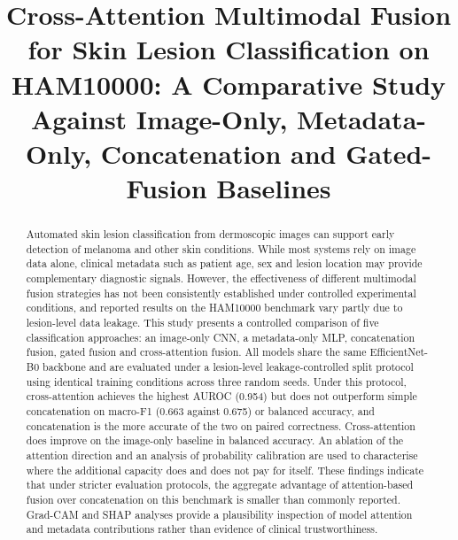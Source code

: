 \documentclass[conference]{IEEEtran}
\begin{document}
\title{Cross-Attention Multimodal Fusion for Skin Lesion Classification on HAM10000: A Comparative Study Against Image-Only, Metadata-Only, Concatenation and Gated-Fusion Baselines}

\author{
}

\maketitle

\begin{abstract}
Automated skin lesion classification from dermoscopic images can support early detection of melanoma and other skin conditions. While most systems rely on image data alone, clinical metadata such as patient age, sex and lesion location may provide complementary diagnostic signals. However, the effectiveness of different multimodal fusion strategies has not been consistently established under controlled experimental conditions, and reported results on the HAM10000 benchmark vary partly due to lesion-level data leakage. This study presents a controlled comparison of five classification approaches: an image-only CNN, a metadata-only MLP, concatenation fusion, gated fusion and cross-attention fusion. All models share the same EfficientNet-B0 backbone and are evaluated under a lesion-level leakage-controlled split protocol using identical training conditions across three random seeds. Under this protocol, cross-attention achieves the highest AUROC (0.954) but does not outperform simple concatenation on macro-F1 (0.663 against 0.675) or balanced accuracy, and concatenation is the more accurate of the two on paired correctness. Cross-attention does improve on the image-only baseline in balanced accuracy. An ablation of the attention direction and an analysis of probability calibration are used to characterise where the additional capacity does and does not pay for itself. These findings indicate that under stricter evaluation protocols, the aggregate advantage of attention-based fusion over concatenation on this benchmark is smaller than commonly reported. Grad-CAM and SHAP analyses provide a plausibility inspection of model attention and metadata contributions rather than evidence of clinical trustworthiness.
\end{abstract}
\end{document}
